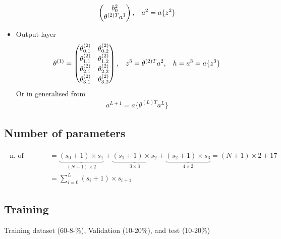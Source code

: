 \documentclass[a4paper,10pt]{article}
\begin{document}
\begin{itemize}
\begin{gather*}
\begin{pmatrix}
                b_0^2 \\
                \theta^{(2)T}a^1 \\
            \end{pmatrix}
            ,\hspace*{0.3cm}
            a^2 = a\{z^2\} 
        \end{gather*}
    \item Output layer 
        \begin{gather*}
            \theta^{(1)} =
                \begin{pmatrix}
                    \theta_{0,1}^{(2)} & \theta_{0,2}^{(2)} \\
                    \theta_{1,1}^{(2)} & \theta_{1,2}^{(2)} \\
                    \theta_{2,1}^{(2)} & \theta_{2,2}^{(2)} \\
                    \theta_{3,1}^{(2)} & \theta_{3,2}^{(2)} \\
                \end{pmatrix}
                ,\hspace*{0.3cm}
                z^3 = \theta^{(2)T}a^2
                ,\hspace*{0.3cm}
                h = a^3 = a\{z^3\} 
            \end{gather*}
            Or in generalised from
            \begin{gather*}
                a^{L+1} = a\{\theta^{(L)T}a^L\}
            \end{gather*}
\end{itemize}

\subsection{Number of parameters}
\begin{gather*}
    \begin{split}
        \text{n. of parameters} &= \underbrace{(s_0+1)\times s_1}_{(N+1)\times 2} + \underbrace{(s_1+1)\times s_2}_{3\times 3} + \underbrace{(s_2+1)\times s_3}_{4\times 2} = (N+1)\times 2+17\\
        & = \sum_{i=0}^{L}(s_i+1)\times s_{i+1}
    \end{split}
\end{gather*}

\subsection{Training}
Training dataset (60-8-\%), Validation (10-20\%), and test (10-20\%)\par 
\end{document}
